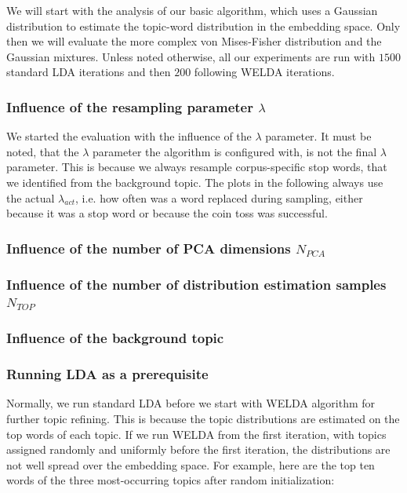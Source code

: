 \documentclass[
        a4paper,
        titlepage,
        twoside,
        parskip
        ]{scrbook}
\theoremstyle{break}
\begin{document}
We will start with the analysis of our basic algorithm, which uses a Gaussian distribution to estimate the topic-word distribution in the embedding space.
Only then we will evaluate the more complex von Mises-Fisher distribution and the Gaussian mixtures.
Unless noted otherwise, all our experiments are run with $1500$ standard LDA iterations and then $200$ following WELDA iterations.

\subsubsection{Influence of the resampling parameter $\lambda$}
We started the evaluation with the influence of the $\lambda$ parameter.
It must be noted, that the $\lambda$ parameter the algorithm is configured with, is not the final $\lambda$ parameter.
This is because we always resample corpus-specific stop words, that we identified from the background topic.
The plots in the following always use the actual $\lambda_{act}$, i.e. how often was a word replaced during sampling, either because it was a stop word or because the coin toss was successful.


\subsubsection{Influence of the number of PCA dimensions $N_{PCA}$}
\subsubsection{Influence of the number of distribution estimation samples $N_{TOP}$}
\subsubsection{Influence of the background topic}
\subsubsection{Running LDA as a prerequisite}
Normally, we run standard LDA before we start with WELDA algorithm for further topic refining.
This is because the topic distributions are estimated on the top words of each topic.
If we run WELDA from the first iteration, with topics assigned randomly and uniformly before the first iteration, the distributions are not well spread over the embedding space.
For example, here are the top ten words of the three most-occurring topics after random initialization: \\
\hspace*{0cm}  \\
\hspace*{0cm}  \\
\hspace*{0cm}  \\
\end{document}
